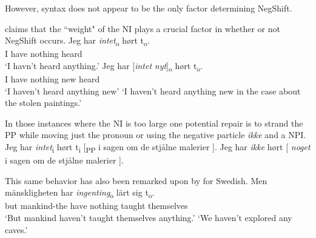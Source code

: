 \documentclass[12pt, letterpaper]{article}
\begin{document}
\ea However, syntax does not appear to be the only factor determining NegShift.  

\ex \citet[65f]{christensenInterfacesNegationSyntax2005} claims that the ``weight" of the NI plays a crucial factor in whether or not NegShift occurs. 
	\ea 
	\gll Jeg har \textit{intet}\textsubscript{o} hørt t\textsubscript{o}.\\
	I have nothing heard\\
	\glt  `I havn't heard anything.'
	\ex 
	\gll Jeg har [\textit{intet} \textit{nyt}]\textsubscript{o} hørt t\textsubscript{o}.\\
	I have nothing new heard\\
	\glt `I haven't heard anything new'
	\glt `I haven't heard anything new in the case about the stolen paintings.'
	\z

\ex In those instances where the NI is too large one potential repair is to strand the PP while moving just the pronoun or using the negative particle \textit{ikke} and a NPI.
	\ea Jeg har \textit{intet}\textsubscript{i} hørt t\textsubscript{i} [\textsubscript{PP} i sagen om de stjålne malerier ].
	\ex Jeg har \textit{ikke} hørt [ \textit{noget} i sagen om de stjålne malerier ].
	\z 
 
\ex This same behavior has also been remarked upon by \citet{penkaNegativeIndefinites2011} for Swedish.
	\ea 
	\gll Men mänskligheten har \textit{ingenting}\textsubscript{o} lärt sig t\textsubscript{o}.\\
	but mankind-the have nothing taught themselves\\
	\glt `But mankind haven't taught themselves anything.'
	\glt `We haven't explored any caves.'
	\z 
\end{document}
